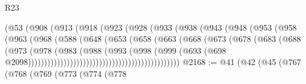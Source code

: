 \begin{lexlean}{R23}
\begin{coremodule}
{{{{{{{{{{{{{{{{{{{{{                                (@53
                                  (@908
                                    (@913
                                      (@918
                                        (@923
                                          (@928
                                            (@933
                                              (@938
                                                (@943
                                                  (@948
                                                    (@953
                                                      (@958
                                                        (@963
                                                          (@968
                                                            (@588
                                                              (@648
                                                                (@653
                                                                  (@658
                                                                    (@663
                                                                      (@668
                                                                        (@673
                                                                          (@678
                                                                            (@683
                                                                              (@688
                                                                                (@973
                                                                                  (@978
                                                                                    (@983
                                                                                      (@988
                                                                                        (@993
                                                                                          (@998
                                                                                            (@999
                                                                                              (@693
                                                                                                (@698
                                                                                                  @2098)))))))))))))))))))))))))))))))))))))))))))))))
@2168 := @41
    (@42
      (@45
        (@767
          (@768
            (@769
              (@773
                (@774
                  (@778
}}}}}}}}}}}}}}}}}}}}}
\end{coremodule}
\end{lexlean}
